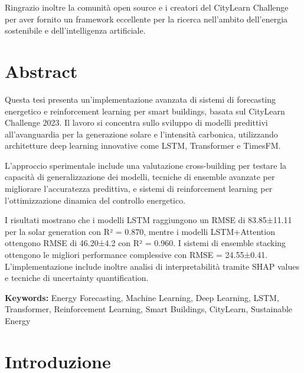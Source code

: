 \documentclass[12pt,a4paper,twoside]{report}
\begin{document}
Ringrazio inoltre la comunità open source e i creatori del CityLearn Challenge per aver fornito un framework eccellente per la ricerca nell'ambito dell'energia sostenibile e dell'intelligenza artificiale.

\chapter*{Abstract}

Questa tesi presenta un'implementazione avanzata di sistemi di forecasting energetico e reinforcement learning per smart buildings, basata sul CityLearn Challenge 2023. Il lavoro si concentra sullo sviluppo di modelli predittivi all'avanguardia per la generazione solare e l'intensità carbonica, utilizzando architetture deep learning innovative come LSTM, Transformer e TimesFM.

L'approccio sperimentale include una valutazione cross-building per testare la capacità di generalizzazione dei modelli, tecniche di ensemble avanzate per migliorare l'accuratezza predittiva, e sistemi di reinforcement learning per l'ottimizzazione dinamica del controllo energetico.

I risultati mostrano che i modelli LSTM raggiungono un RMSE di 83.85±11.11 per la solar generation con R² = 0.870, mentre i modelli LSTM+Attention ottengono RMSE di 46.20±4.2 con R² = 0.960. I sistemi di ensemble stacking ottengono le migliori performance complessive con RMSE = 24.55±0.41. L'implementazione include inoltre analisi di interpretabilità tramite SHAP values e tecniche di uncertainty quantification.

\textbf{Keywords:} Energy Forecasting, Machine Learning, Deep Learning, LSTM, Transformer, Reinforcement Learning, Smart Buildings, CityLearn, Sustainable Energy

\tableofcontents
\listoffigures
\listoftables

\newpage
{}



\chapter{Introduzione}
\end{document}
